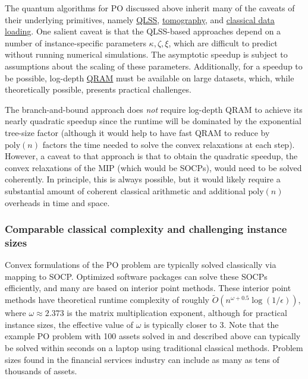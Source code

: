 \begin{refsection}
The quantum algorithms for PO discussed above inherit many of the caveats of their underlying primitives, namely \hyperref[prim:QuantumLinearSystemSolvers]{QLSS}, \hyperref[prim:Tomography]{tomography}, and \hyperref[prim:LoadingClassicalData]{classical data loading}. One salient caveat is that the QLSS-based approaches depend on a number of instance-specific parameters $\kappa, \zeta,\xi$, which are difficult to predict without running numerical simulations. The asymptotic speedup is subject to assumptions about the scaling of these parameters. Additionally, for a speedup to be possible, log-depth \hyperref[prim:QRAM]{QRAM} must be available on large datasets, which, while theoretically possible, presents practical challenges. 

The branch-and-bound approach does \textit{not} require log-depth QRAM to achieve its nearly quadratic speedup since the runtime will be dominated by the exponential tree-size factor (although it would help to have fast QRAM to reduce by $\mathrm{poly}(n)$ factors the time needed to solve the convex relaxations at each step). However, a caveat to that approach is that to obtain the quadratic speedup, the convex relaxations of the MIP (which would be SOCPs), would need to be solved coherently. In principle, this is always possible, but it would likely require a substantial amount of coherent classical arithmetic and additional $\mathrm{poly}(n)$ overheads in time and space. 


\subsubsection*{Comparable classical complexity and challenging instance sizes}

Convex formulations of the PO problem are typically solved classically via mapping to SOCP. Optimized software packages can solve these SOCPs efficiently, and many are based on interior point methods. These interior point methods have theoretical runtime complexity of roughly $\tilde{O}(n^{\omega+0.5}\log(1/\epsilon))$, where $\omega\approx 2.373$ is the matrix multiplication exponent, although for practical instance sizes, the effective value of $\omega$ is typically closer to 3. Note that the example PO problem with 100 assets solved in \cite{dalzell2022socp} and described above can typically be solved within seconds on a laptop using traditional classical methods. Problem sizes found in the financial services industry can include as many as tens of thousands of assets.


\end{refsection}
